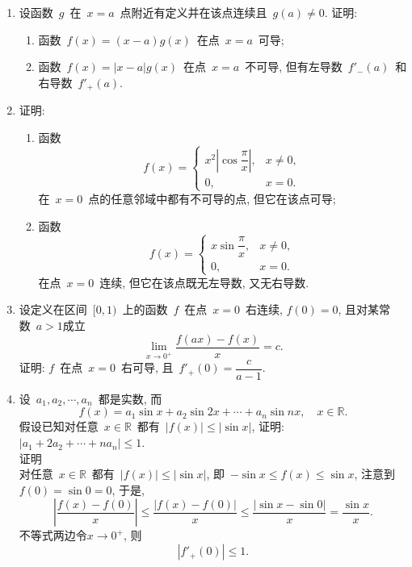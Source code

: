 \documentclass[UTF8,a4paper,20pt]{article}
\begin{document}
\begin{enumerate}[1.]
\item 设函数~$g$~在~$x=a$~点附近有定义并在该点连续且~$g(a)\neq 0$. 证明:
	\begin{enumerate}[(1)]
	\item 函数~$f(x)=(x-a)g(x)$~在点~$x=a$~可导;
	\item 函数~$f(x)=|x-a|g(x)$~在点~$x=a$~不可导, 但有左导数~$f'_{-}(a)$~和右导数~$f'_{+}(a)$.
	\end{enumerate}

\item 证明:
	\begin{enumerate}[(1)]
	\item 函数
	\[ f(x)=\begin{cases} x^2\left|\cos{\dfrac{\pi}{x}}\right|, &x\neq 0,\\ 0, &x=0.\end{cases} \]
在~$x=0$~点的任意邻域中都有不可导的点, 但它在该点可导;
	\item 函数
	\[ f(x)=\begin{cases} x\sin{\dfrac{\pi}{x}}, &x\neq 0,\\ 0, &x=0.\end{cases} \]
在点~$x=0$~连续, 但它在该点既无左导数, 又无右导数.
	\end{enumerate}

\item 设定义在区间~$[0,1)$~上的函数~$f$~在点~$x=0$~右连续, $f(0)=0$, 且对某常数~$a>1$成立
\[ \lim\limits_{x\to0^{+}}\dfrac{f(ax)-f(x)}{x}=c.\]
证明: $f$~在点~$x=0$~右可导, 且~$f'_{+}(0)=\dfrac{c}{a-1}$.

\item 设~$a_1, a_2, \cdots, a_n$~都是实数, 而
\[ f(x)=a_1\sin{x}+a_2\sin{2x}+\cdots+a_n\sin{nx}, \quad x\in\mathbb{R}. \]
假设已知对任意~$x\in\mathbb{R}$~都有~$|f(x)|\leqslant|\sin{x}|$, 证明: $|a_1+2a_2+\cdots+na_n|\leqslant 1$.\\
{\heiti 证明}\\
对任意~$x\in\mathbb{R}$~都有~$|f(x)|\leqslant|\sin{x}|$, 即~$-\sin{x}\leqslant f(x)\leqslant \sin{x}$, 注意到~$f(0)=\sin{0}=0$, 于是,
\[|\dfrac{f(x)-f(0)}{x}|\leqslant\dfrac{|f(x)-f(0)|}{x}\leqslant\dfrac{|\sin{x}-\sin{0}|}{x}=\dfrac{\sin{x}}{x}.\]
不等式两边令$x\to 0^{+}$, 则
\[|f'_{+}(0)|\leqslant 1.\]
\end{enumerate}
\end{document}
